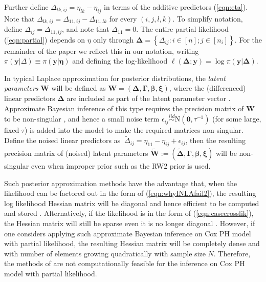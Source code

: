 \documentclass[ba]{imsart}
\begin{document}
Further define $\Delta_{lk,ij} = \eta_{lk} - \eta_{ij}$ in terms of the additive predictors (\ref{eqn:eta}). Note that $\Delta_{lk,ij} = \Delta_{11,ij} - \Delta_{11,lk}$ for every $(i,j,l,k)$. To simplify notation, define $\Delta_{ij} = \Delta_{11,ij}$, and note that $\Delta_{11} = 0$. The entire partial likelihood (\ref{eqn:partial}) depends on $\eta$ only through  $\boldsymbol{\Delta} = \left\{\Delta_{ij}: i \in [n]; j \in [n_{i}] \right\}$. For the remainder of the paper we reflect this in our notation, writing $\pi(\boldsymbol{y}|\Delta) \equiv \pi(\boldsymbol{y}|\boldsymbol{\eta})$ and defining the log-likelihood $\ell(\boldsymbol{\Delta}; \boldsymbol{y}) = \log\pi(\boldsymbol{y}|\boldsymbol{\Delta})$.

In typical Laplace approximation for posterior distributions, the \textit{latent parameters} $\boldsymbol{W}$ will be defined as $\boldsymbol{W} = \left(\boldsymbol{\Delta}, \boldsymbol{\Gamma},\boldsymbol{\beta}, \boldsymbol{\xi} \right)$, where the (differenced) linear predictors $\boldsymbol{\Delta}$ are included as part of the latent parameter vector \citep{inla,inlacoxph,casecross}. Approximate Bayesian inference of this type requires the precision matrix of $\boldsymbol{W}$ to be non-singular \citep{tierney}, and hence a small noise term $\epsilon_{ij} \stackrel{iid}{\sim} \text{N}(\boldsymbol{0},\tau^{-1})$ (for some large, fixed $\tau$) is added into the model to make the required matrices non-singular. Define the noised linear predictors as $\ \tilde{\Delta}_{ij} = \eta_{11} - \eta_{ij} + \epsilon_{ij}$, then the resulting precision matrix of (noised) latent parameters $\boldsymbol{\tilde{W}} := (\boldsymbol{\tilde{\Delta}}, \boldsymbol{\Gamma},\boldsymbol{\beta}, \boldsymbol{\xi} )$ will be non-singular even when improper prior such as the RW2 prior is used.

Such posterior approximation methods have the advantage that, when the likelihood can be factored out in the form of (\ref{eqn:whyINLAfail2}), the resulting log likelihood Hessian matrix will be diagonal and hence efficient to be computed and stored \citep{inla}. Alternatively, if the likelihood is in the form of (\ref{eqn:casecrosslik}), the Hessian matrix will still be sparse even it is no longer diagonal \citep{casecross}. However, if one considers applying such approximate Bayesian inference on Cox PH model with partial likelihood, the resulting Hessian matrix will be completely dense and with number of elements growing quadratically with sample size $N$. Therefore, the methods of \cite{inla,inlacoxph,casecross} are not computationally feasible for the inference on Cox PH model with partial likelihood. 
\end{document}
